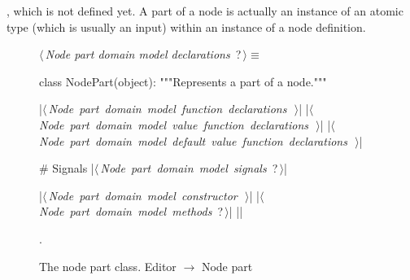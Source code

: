 \documentclass[%
    a4paper,    %
    justified,  %
    nobib,      %
    openany     %
]{tufte-book}
\makeatletter
\renewcommand{\label}[1]{\@tufte@label{##1}}%
\makeatother
\begin{document}
,
which is not defined yet. A part of a node is actually an instance of an atomic
type (which is usually an input) within an instance of a node definition.

\begin{figure}
\begin{flushleft} \small
\begin{minipage}{\linewidth}\label{scrap115}\raggedright\small
{} $\langle\,${\itshape Node part domain model declarations}\nobreak\ {\footnotesize {?}}$\,\rangle\equiv$
\vspace{-1ex}
\begin{pythoncode}
class NodePart(object):
    """Represents a part of a node."""

    |\hbox{$\langle\,${\itshape Node part domain model function declarations}\nobreak\ {\footnotesize {}}$\,\rangle$}|
    |\hbox{$\langle\,${\itshape Node part domain model value function declarations}\nobreak\ {\footnotesize {}}$\,\rangle$}|
    |\hbox{$\langle\,${\itshape Node part domain model default value function declarations}\nobreak\ {\footnotesize {}}$\,\rangle$}|

    # Signals
    |\hbox{$\langle\,${\itshape Node part domain model signals}\nobreak\ {\footnotesize ?}$\,\rangle$}|

    |\hbox{$\langle\,${\itshape Node part domain model constructor}\nobreak\ {\footnotesize {}}$\,\rangle$}|
    |\hbox{$\langle\,${\itshape Node part domain model methods}\nobreak\ {\footnotesize ?}$\,\rangle$}|
|\NWsep|
\end{pythoncode}
\vspace{1.5ex}
\footnotesize
\begin{list}{}{\setlength{\itemsep}{-\parsep}\setlength{\itemindent}{-\leftmargin}}
\item {\NWtxtMacroNoRef}.

\item{}
\end{list}
\end{minipage}\vspace{4ex}
\end{flushleft}
\caption{The node part class.
  \newline{}\newline{}Editor $\rightarrow$ Node part}
\label{editor:lst:node-part}
\end{figure}
\end{document}
